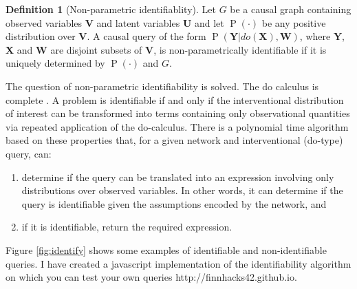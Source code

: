 \documentclass[11pt,a4paper,twoside]{report}
\renewcommand{\P}[1]{\operatorname{P}\left(#1\right)}
\theoremstyle{plain}
\theoremstyle{definition}
\newtheorem{definition}[theorem]{Definition}
\begin{document}
\vspace*{.3cm}
\begin{definition}[Non-parametric identifiablity]
Let $G$ be a causal graph containing observed variables $\boldsymbol{V}$ and latent variables $\boldsymbol{U}$ and let $\P{\cdot}$ be any positive distribution over $\boldsymbol{V}$. A causal query of the form $\P{\boldsymbol{Y}|do(\boldsymbol{X}),\boldsymbol{W}}$, where $\boldsymbol{Y}$,$\boldsymbol{X}$ and $\boldsymbol{W}$ are disjoint subsets of $\boldsymbol{V}$, is non-parametrically identifiable if it is uniquely determined by $\P{\cdot}$ and $G$.
\end{definition} 

The question of non-parametric identifiability is solved. The do calculus is complete \citep{Shpitser2006b,Huang2006}. A problem is identifiable if and only if the interventional distribution of interest can be transformed into terms containing only observational quantities via repeated application of the do-calculus. There is a polynomial time algorithm \citep{Shpitser2006a} based on these properties that, for a given network and interventional (do-type) query, can:

\begin{enumerate}
\item determine if the query can be translated into an expression involving only distributions over observed variables. In other words, it can determine if the query is identifiable given the assumptions encoded by the network, and
\item if it is identifiable, return the required expression. 
\end{enumerate}

Figure \ref{fig:identify} shows some examples of identifiable and non-identifiable queries. I have created a javascript implementation of the identifiability algorithm \citep{Shpitser2006a} on which you can test your own queries http://finnhacks42.github.io.
\end{document}
